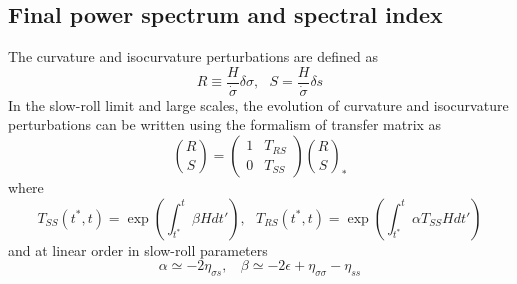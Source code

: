 \documentclass[amssymb,twocolumn,prd,nofootinbib,showpacs]{revtex4-1}
\begin{document}
\subsection{Final power spectrum and spectral index}
The curvature and isocurvature perturbations are defined as
\begin{equation}\label{RS}
R\equiv\frac{H}{\dot\sigma}\delta \sigma, \ \ \ S=\frac{H}{\dot \sigma}\delta s
\end{equation}
In the slow-roll limit and large scales, the evolution of curvature and isocurvature perturbations can be written using the formalism of transfer matrix as
\begin{equation}
\binom{R }{S}=\begin{pmatrix}1 & T_{RS}\\ 0& T_{SS}\end{pmatrix}\binom{R}{S}_*
\end{equation}
where
\begin{subequations}
\begin{equation}
T_{SS}(t^*,t)=\exp\left(\int^t_{t^*}\beta Hdt'\right), \ \ \
\end{equation}
\begin{equation}\label{TRS}
T_{RS}(t^*,t)=\exp\left(\int^t_{t^*}\alpha T_{SS}Hdt'\right)
\end{equation}
\end{subequations}
and at linear order in slow-roll parameters
\begin{equation}
\alpha\simeq -2\eta_{\sigma s}, \ \ \ \ \beta\simeq-2\epsilon+\eta_{\sigma\sigma}-\eta_{ss}
\end{equation}
\end{document}
